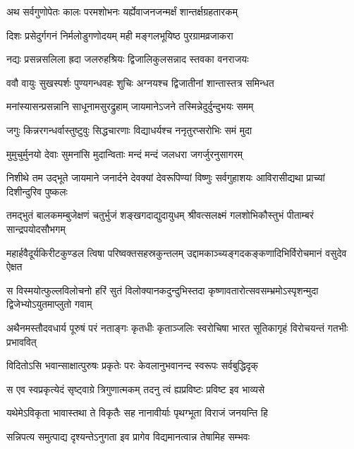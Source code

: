 

\twolineshloka
{अथ सर्वगुणोपेतः कालः परमशोभनः}
{यर्ह्येवाजनजन्मर्क्षं शान्तर्क्षग्रहतारकम्} %

\twolineshloka
{दिशः प्रसेदुर्गगनं निर्मलोडुगणोदयम्}
{मही मङ्गलभूयिष्ठ पुरग्रामव्रजाकरा} %

\twolineshloka
{नद्यः प्रसन्नसलिला ह्रदा जलरुहश्रियः}
{द्विजालिकुलसन्नाद स्तवका वनराजयः} %

\twolineshloka
{ववौ वायुः सुखस्पर्शः पुण्यगन्धवहः शुचिः}
{अग्नयश्च द्विजातीनां शान्तास्तत्र समिन्धत} %

\twolineshloka
{मनांस्यासन्प्रसन्नानि साधूनामसुरद्रुहाम्}
{जायमानेऽजने तस्मिन्नेदुर्दुन्दुभयः समम्} %

\twolineshloka
{जगुः किन्नरगन्धर्वास्तुष्टुवुः सिद्धचारणाः}
{विद्याधर्यश्च ननृतुरप्सरोभिः समं मुदा} %

\twolineshloka
{मुमुचुर्मुनयो देवाः सुमनांसि मुदान्विताः}
{मन्दं मन्दं जलधरा जगर्जुरनुसागरम्} %

\threelineshloka
{निशीथे तम उद्भूते जायमाने जनार्दने}
{देवक्यां देवरूपिण्यां विष्णुः सर्वगुहाशयः}
{आविरासीद्यथा प्राच्यां दिशीन्दुरिव पुष्कलः}

\twolineshloka
{तमद्भुतं बालकमम्बुजेक्षणं चतुर्भुजं शङ्खगदाद्युदायुधम्}
{श्रीवत्सलक्ष्मं गलशोभिकौस्तुभं पीताम्बरं सान्द्रपयोदसौभगम्} %

\twolineshloka
{महार्हवैदूर्यकिरीटकुण्डल त्विषा परिष्वक्तसहस्रकुन्तलम्}
{उद्दामकाञ्च्यङ्गदकङ्कणादिभिर्विरोचमानं वसुदेव ऐक्षत} %

\twolineshloka
{स विस्मयोत्फुल्लविलोचनो हरिं सुतं विलोक्यानकदुन्दुभिस्तदा}
{कृष्णावतारोत्सवसम्भ्रमोऽस्पृशन्मुदा द्विजेभ्योऽयुतमाप्लुतो गवाम्} %

\twolineshloka
{अथैनमस्तौदवधार्य पूरुषं परं नताङ्गः कृतधीः कृताञ्जलिः}
{स्वरोचिषा भारत सूतिकागृहं विरोचयन्तं गतभीः प्रभाववित्} %



\twolineshloka
{विदितोऽसि भवान्साक्षात्पुरुषः प्रकृतेः परः}
{केवलानुभवानन्द स्वरूपः सर्वबुद्धिदृक्} %

\twolineshloka
{स एव स्वप्रकृत्येदं सृष्ट्वाग्रे त्रिगुणात्मकम्}
{तदनु त्वं ह्यप्रविष्टः प्रविष्ट इव भाव्यसे} %

\twolineshloka
{यथेमेऽविकृता भावास्तथा ते विकृतैः सह}
{नानावीर्याः पृथग्भूता विराजं जनयन्ति हि} %

\twolineshloka
{सन्निपत्य समुत्पाद्य दृश्यन्तेऽनुगता इव}
{प्रागेव विद्यमानत्वान्न तेषामिह सम्भवः} %

